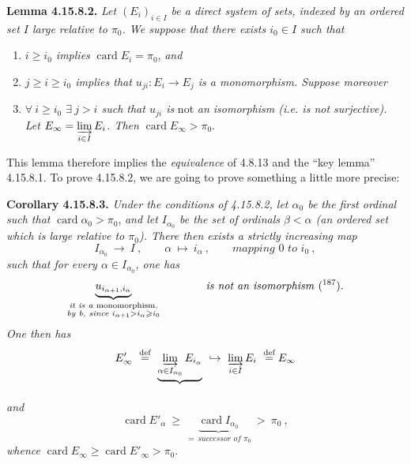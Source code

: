 \documentclass[11pt]{article}
\newcommand{\msp}[1]{\marginpar{\footnotesize [#1]}}
\newcommand{\card}{\operatorname{card}}
\begin{document}
\msp{page 458}
\textbf{Lemma 4.15.8.2.} \textit{Let $(E_i)_{i\in I}$ be a direct system of sets, indexed by an ordered set $I$ large relative to $\pi_0$. We suppose that there exists $i_0 \in I$ such that}
\begin{enumerate}[nosep]
\item[\textit{a)}] \textit{$i \geqslant i_0$ implies} $\card E_i = \pi_0$, \textit{and}
\item[\textit{b)}] \textit{$j \geqslant i \geqslant i_0$ implies that $u_{ji} : E_i \longrightarrow E_j$ is a monomorphism. Suppose moreover}
\item[\textit{c)}] \textit{$\forall\ i \geqslant i_0$ $\exists\ j > i$ such that $u_{ji}$ is} not \textit{an isomorphism (i.e. is not surjective). Let $E_\infty = \varinjlim\limits_{i\in I} E_i$. Then} $\card E_\infty > \pi_0$.
\end{enumerate}
This lemma therefore implies the \textit{equivalence} of 4.8.13 and the ``key lemma'' 4.15.8.1. To prove 4.15.8.2, we are going to prove something a little more precise:

\textbf{Corollary 4.15.8.3.} \textit{Under the conditions of 4.15.8.2, let $\alpha_0$ be the first ordinal such that} $\card \alpha_0 > \pi_0$, \textit{and let $I_{\alpha_0}$ be the set of ordinals $\beta < \alpha$ (an ordered set which is large relative to $\pi_0$). There then exists a strictly increasing map}
\[
I_{\alpha_0} \ \longrightarrow \ I \ , \qquad \alpha \ \longmapsto \ i_\alpha \ , \qquad \textit{mapping } 0 \textit{ to } i_0 \ ,
\]
\msp{page 459}
\textit{such that for every $\alpha \in I_{\alpha_0}$, one has}
\[
\underbrace{u_{i_{\alpha+1},i_\alpha}}_{\substack{\textit{it is a } \text{monomorphism,}\\ \textit{by b, since } i_{\alpha+1} > i_\alpha \geqslant i_0}} \qquad\qquad \text{\textit{is not an isomorphism} (\footnotemark[187]).}
\]
\textit{One then has}
\[
E'_\infty \ \overset{\text{def}}{=} \ \underbrace{\varinjlim_{\alpha\in I_{\alpha_0}} E_{i_\alpha}}_{} \ \hookrightarrow \ \varinjlim_{i\in I} E_i \ \overset{\text{def}}{=} E_\infty
\]
\textit{and}
\[
\card E'_\alpha \ \geqslant \ \underbrace{\card I_{\alpha_0}}_{=\ \textit{successor of } \pi_0} \ > \ \pi_0 \ ,
\] %
\textit{whence} $\card E_\infty \geqslant \card E'_\infty > \pi_0$.
\end{document}
